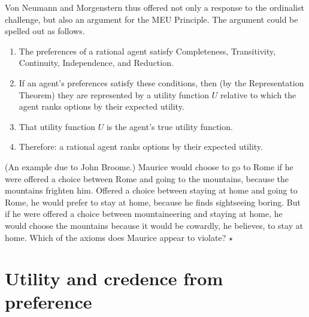 Von Neumann and Morgenstern thus offered not only a response to the
ordinalist challenge, but also an argument for the MEU Principle. The
argument could be spelled out as follows.

\begin{enumerate}
  \itemsep0em
\item The preferences of a rational agent satisfy Completeness,
  Transitivity, Continuity, Independence, and Reduction.
\item If an agent's preferences satisfy these conditions, then (by the
  Representation Theorem) they are represented by a utility function
  $U$ relative to which the agent ranks options by their expected utility.
\item That utility function $U$ is the agent's true utility function.
\item Therefore: a rational agent ranks options by their expected utility.
\end{enumerate}


\begin{exercise}
  (An example due to John Broome.) Maurice would choose to go to Rome
  if he were offered a choice between Rome and going to the mountains,
  because the mountains frighten him. Offered a choice between staying
  at home and going to Rome, he would prefer to stay at home, because
  he finds sightseeing boring. But if he were offered a choice between
  mountaineering and staying at home, he would choose the mountains
  because it would be cowardly, he believes, to stay at home. Which of
  the axioms does Maurice appear to violate? $\star$
\end{exercise}


\section{Utility and credence from preference}

